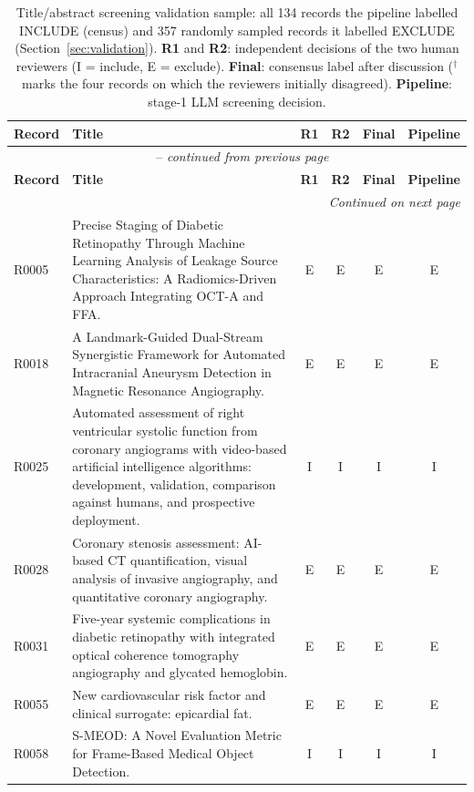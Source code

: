\renewcommand{\arraystretch}{1.05}
\footnotesize
\onecolumn
\begin{longtable}{@{}l p{8.6cm} c c c c@{}}
\caption{Title/abstract screening validation sample: all 134 records the pipeline labelled INCLUDE (census) and 357 randomly sampled records it labelled EXCLUDE (Section~\ref{sec:validation}). \textbf{R1} and \textbf{R2}: independent decisions of the two human reviewers (I = include, E = exclude). \textbf{Final}: consensus label after discussion ($^{\dagger}$ marks the four records on which the reviewers initially disagreed). \textbf{Pipeline}: stage-1 LLM screening decision.}
\label{tab:screening_validation_full} \\
\toprule
\textbf{Record} & \textbf{Title} & \textbf{R1} & \textbf{R2} & \textbf{Final} & \textbf{Pipeline} \\
\midrule
\endfirsthead
\multicolumn{6}{c}{\tablename~\thetable{} -- \textit{continued from previous page}} \\
\toprule
\textbf{Record} & \textbf{Title} & \textbf{R1} & \textbf{R2} & \textbf{Final} & \textbf{Pipeline} \\
\midrule
\endhead
\midrule
\multicolumn{6}{r}{\textit{Continued on next page}} \\
\endfoot
\bottomrule
\endlastfoot
R0005 & Precise Staging of Diabetic Retinopathy Through Machine Learning Analysis of Leakage Source Characteristics: A Radiomics-Driven Approach Integrating OCT-A and FFA. & E & E & E & E \\
R0018 & A Landmark-Guided Dual-Stream Synergistic Framework for Automated Intracranial Aneurysm Detection in Magnetic Resonance Angiography. & E & E & E & E \\
R0025 & Automated assessment of right ventricular systolic function from coronary angiograms with video-based artificial intelligence algorithms: development, validation, comparison against humans, and prospective deployment. & I & I & I & I \\
R0028 & Coronary stenosis assessment: AI-based CT quantification, visual analysis of invasive angiography, and quantitative coronary angiography. & E & E & E & E \\
R0031 & Five-year systemic complications in diabetic retinopathy with integrated optical coherence tomography angiography and glycated hemoglobin. & E & E & E & E \\
R0055 & New cardiovascular risk factor and clinical surrogate: epicardial fat. & E & E & E & E \\
R0058 & S-MEOD: A Novel Evaluation Metric for Frame-Based Medical Object Detection. & I & I & I & I \\

\end{longtable}

